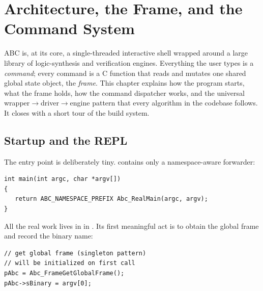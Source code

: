 \chapter{Architecture, the Frame, and the Command System}
\label{ch:arch}

ABC is, at its core, a single-threaded interactive shell wrapped around a large
library of logic-synthesis and verification engines. Everything the user types
is a \emph{command}; every command is a C function that reads and mutates one
shared global state object, the \emph{frame}. This chapter explains how the
program starts, what the frame holds, how the command dispatcher works, and the
universal wrapper$\to$driver$\to$engine pattern that every algorithm in the
codebase follows. It closes with a short tour of the build system.


\section{Startup and the REPL}
\label{sec:startup}

The entry point is deliberately tiny.  contains only
a namespace-aware forwarder:

\begin{lstlisting}[style=abccode]
int main(int argc, char *argv[])
{
   return ABC_NAMESPACE_PREFIX Abc_RealMain(argc, argv);
}
\end{lstlisting}

All the real work lives in  in
. Its first meaningful act is to obtain the global
frame and record the binary name:

\begin{lstlisting}[style=abccode]
// get global frame (singleton pattern)
// will be initialized on first call
pAbc = Abc_FrameGetGlobalFrame();
pAbc->sBinary = argv[0];
\end{lstlisting}

